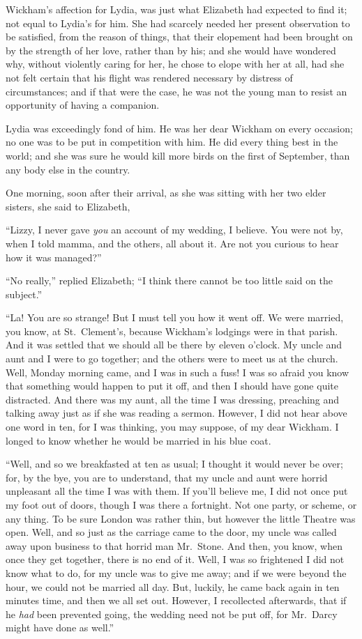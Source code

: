 Wickham’s affection for Lydia, was just what Elizabeth
had expected to find it; not equal to Lydia’s for him.
She had scarcely needed her present observation to be
satisfied, from the reason of things, that their elopement
had been brought on by the strength of her love, rather
than by his; and she would have wondered why, without
violently caring for her, he chose to elope with her at
all, had she not felt certain that his flight was rendered
necessary by distress of circumstances; and if that were
the case, he was not the young man to resist an opportunity
of having a companion.

Lydia was exceedingly fond of him. He was her dear
Wickham on every occasion; no one was to be put in
competition with him. He did every thing best in the
world; and she was sure he would kill more birds on the
first of September, than any body else in the country.

One morning, soon after their arrival, as she was sitting
with her two elder sisters, she said to Elizabeth,

“Lizzy, I never gave \textit{you} an account of my wedding,
I believe. You were not by, when I told mamma, and the
others, all about it. Are not you curious to hear how it
was managed?”

“No really,” replied Elizabeth; “I think there cannot
be too little said on the subject.”

“La! You are so strange! But I must tell you how
it went off. We were married, you know, at St.\ Clement’s,
because Wickham’s lodgings were in that parish. And
it was settled that we should all be there by eleven o’clock.
My uncle and aunt and I were to go together; and the
others were to meet us at the church. Well, Monday
morning came, and I was in such a fuss! I was so afraid
you know that something would happen to put it off, and
then I should have gone quite distracted. And there was
my aunt, all the time I was dressing, preaching and
talking away just as if she was reading a sermon. However,
I did not hear above one word in ten, for I was
thinking, you may suppose, of my dear Wickham. I longed
to know whether he would be married in his blue coat.

“Well, and so we breakfasted at ten as usual; I
thought it would never be over; for, by the bye, you are
to understand, that my uncle and aunt were horrid
unpleasant all the time I was with them. If you’ll believe
me, I did not once put my foot out of doors, though I was
there a fortnight. Not one party, or scheme, or any thing.
To be sure London was rather thin, but however the
little Theatre was open. Well, and so just as the carriage
came to the door, my uncle was called away upon business
to that horrid man Mr.\ Stone. And then, you know,
when once they get together, there is no end of it. Well,
I was so frightened I did not know what to do, for my
uncle was to give me away; and if we were beyond the
hour, we could not be married all day. But, luckily, he
came back again in ten minutes time, and then we all
set out. However, I recollected afterwards, that if he
\textit{had} been prevented going, the wedding need not be put
off, for Mr.\ Darcy might have done as well.”

